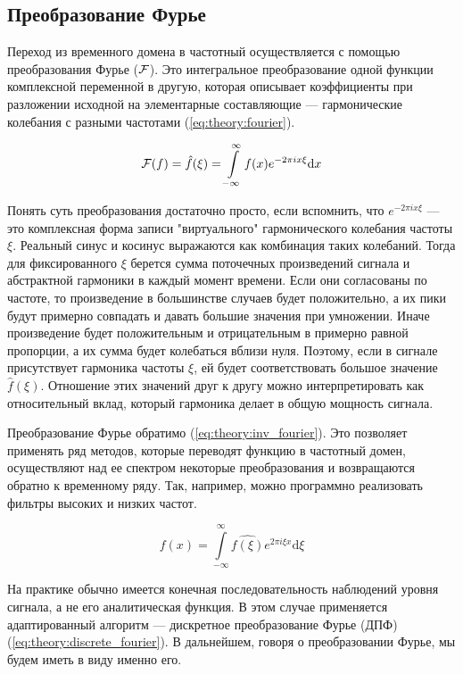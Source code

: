 \subsection{Преобразование Фурье}

Переход из временного домена в частотный осуществляется с помощью преобразования Фурье ($\mathcal{F}$). Это интегральное преобразование одной функции комплексной переменной в другую, которая описывает коэффициенты при разложении исходной на элементарные составляющие --- гармонические колебания с разными частотами (\autoref{eq:theory:fourier}).

\begin{equation}
  \label{eq:theory:fourier}
  \mathcal{F}(f) = \hat{f}(\xi) = \int\limits_{-\infty}^{\infty} f(x) e^{-2 \pi i x \xi} \mathrm{d}x
\end{equation}

Понять суть преобразования достаточно просто, если вспомнить, что $e^{-2 \pi i x \xi}$ --- это комплексная форма записи "виртуального" гармонического колебания частоты $\xi$. Реальный синус и косинус выражаются как комбинация таких колебаний. Тогда для фиксированного $\xi$ берется сумма поточечных произведений сигнала и абстрактной гармоники в каждый момент времени. Если они согласованы по частоте, то произведение в большинстве случаев будет положительно, а их пики будут примерно совпадать и давать большие значения при умножении. Иначе произведение будет положительным и отрицательным в примерно равной пропорции, а их сумма будет колебаться вблизи нуля. Поэтому, если в сигнале присутствует гармоника частоты $\xi$, ей будет соответствовать большое значение $\hat{f}(\xi)$. Отношение этих значений друг к другу можно интерпретировать как относительный вклад, который гармоника делает в общую мощность сигнала.

Преобразование Фурье обратимо (\autoref{eq:theory:inv_fourier}). Это позволяет применять ряд методов, которые переводят функцию в частотный домен, осуществляют над ее спектром некоторые преобразования и возвращаются обратно к временному ряду. Так, например, можно программно реализовать фильтры высоких и низких частот.

\begin{equation}
  \label{eq:theory:inv_fourier}
  f(x) = \int\limits_{-\infty}^{\infty} \hat{f(\xi)} e^{2 \pi i \xi x} \mathrm{d}\xi
\end{equation}

На практике обычно имеется конечная последовательность наблюдений уровня сигнала, а не его аналитическая функция. В этом случае применяется адаптированный алгоритм --- дискретное преобразование Фурье (ДПФ) (\autoref{eq:theory:discrete_fourier}). В дальнейшем, говоря о преобразовании Фурье, мы будем иметь в виду именно его.

